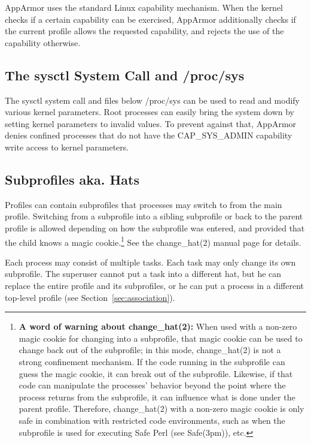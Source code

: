 \documentclass[a4paper]{article}
\renewcommand{\H}{\hspace{0pt}}
\begin{document}
AppArmor uses the standard Linux capability mechanism.  When the kernel
checks if a certain capability can be exercised, AppArmor additionally
checks if the current profile allows the requested capability, and
rejects the use of the capability otherwise.


\subsection{The sysctl System Call and /proc/sys}

The sysctl system call and files below /proc/sys
can be used to read and modify various kernel parameters.  Root processes
can easily bring the system down by setting kernel parameters to invalid
values.  To prevent against that, AppArmor denies confined processes
that do not have the CAP\_{\H}SYS\_{\H}ADMIN capability write access to kernel
parameters.


\subsection{Subprofiles aka. Hats}

Profiles can contain subprofiles that processes may switch to from the
main profile.  Switching from a subprofile into a sibling subprofile or
back to the parent profile is allowed depending on how the subprofile
was entered, and provided that the child knows a magic cookie.\footnote{
    \textbf{A word of warning about change\_hat(2):} When used with a
    non-zero magic cookie for changing into a subprofile, that magic
    cookie can be used to change back out of the subprofile; in this
    mode, change\_hat(2) is not a strong confinement mechanism. If the
    code running in the subprofile can guess the magic cookie, it can
    break out of the subprofile.  Likewise, if that code can manipulate
    the processes' behavior beyond the point where the process returns
    from the subprofile, it can influence what is done under the parent
    profile. Therefore, change\_hat(2) with a non-zero magic cookie is
    only safe in combination with restricted code environments, such as
    when the subprofile is used for executing Safe Perl (see Safe(3pm)),
    etc.
} See the change\_hat(2) manual page for details.

Each process may consist of multiple tasks.  Each task may only change
its own subprofile.  The superuser cannot put a task into a different
hat, but he can replace the entire profile and its subprofiles, or he
can put a process in a different top-level profile (see
Section~\ref{sec:association}).
\end{document}
